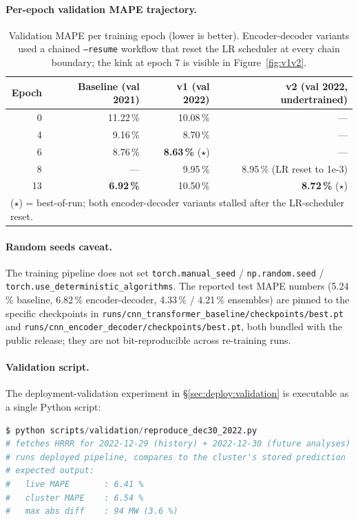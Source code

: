 \paragraph{Per-epoch validation MAPE trajectory.}

\begin{table}[h]
\centering\small
\caption{Validation MAPE per training epoch (lower is better). Encoder-decoder variants used a chained \texttt{--resume} workflow that reset the LR scheduler at every chain boundary; the kink at epoch 7 is visible in Figure~\ref{fig:v1v2}.}
\label{tab:trajectory}
\begin{tabular}{@{}rrrr@{}}
\toprule
Epoch & Baseline (val 2021) & v1 (val 2022) & v2 (val 2022, undertrained) \\
\midrule
0  & 11.22\,\% & 10.08\,\% & --- \\
4  & 9.16\,\%  & 8.70\,\%  & --- \\
6  & 8.76\,\%  & \textbf{8.63\,\%} ($\star$) & --- \\
8  & ---       & 9.95\,\%  & 8.95\,\% (LR reset to 1e-3) \\
13 & \textbf{6.92\,\%} & 10.50\,\% & \textbf{8.72\,\%} ($\star$) \\
\bottomrule
\multicolumn{4}{l}{\footnotesize ($\star$) = best-of-run; both encoder-decoder variants stalled after the LR-scheduler reset.} \\
\end{tabular}
\end{table}

\paragraph{Random seeds caveat.} The training pipeline does not set \texttt{torch.manual\_seed} / \texttt{np.random.seed} / \texttt{torch.use\_deterministic\_algorithms}. The reported test MAPE numbers (5.24\,\% baseline, 6.82\,\% encoder-decoder, 4.33\,\% / 4.21\,\% ensembles) are pinned to the specific checkpoints in \texttt{runs/cnn\_transformer\_baseline/checkpoints/best.pt} and \texttt{runs/cnn\_encoder\_decoder/checkpoints/best.pt}, both bundled with the public release; they are not bit-reproducible across re-training runs.

\paragraph{Validation script.} The deployment-validation experiment in \S\ref{sec:deploy:validation} is executable as a single Python script:
\begin{lstlisting}[language=Python, basicstyle=\ttfamily\footnotesize]
$ python scripts/validation/reproduce_dec30_2022.py
# fetches HRRR for 2022-12-29 (history) + 2022-12-30 (future analyses)
# runs deployed pipeline, compares to the cluster's stored prediction
# expected output:
#   live MAPE       : 6.41 %
#   cluster MAPE    : 6.54 %
#   max abs diff    : 94 MW (3.6 %)
\end{lstlisting}

